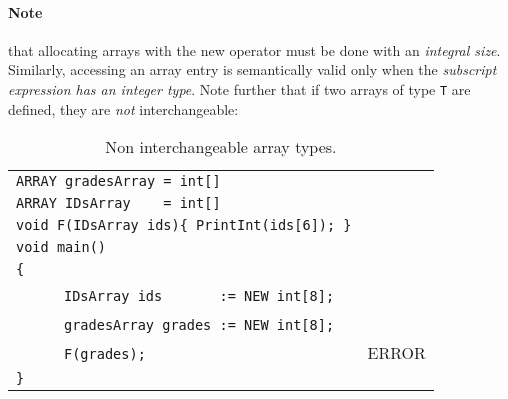 \documentclass{article}
\begin{document}
\paragraph{Note} that allocating arrays with the new operator
must be done with an \textit{integral size}.
Similarly, accessing an array entry is semantically valid
only when the \textit{subscript expression has an integer type}.
Note further that if two arrays of type \verb"T" are defined,
they are \textit{not} interchangeable:
\begin{table}[h]
\centering
\begin{tabular}{ | l | l | }
\hline
\verb"ARRAY gradesArray = int[]"                 &       \\
\verb"ARRAY IDsArray    = int[]"                 &       \\
\verb"void F(IDsArray ids){ PrintInt(ids[6]); }" &       \\
\verb"void main()"                               &       \\
\verb"{"                                         &       \\
~ ~ ~ ~\verb"IDsArray ids       := NEW int[8];"  &       \\
~ ~ ~ ~\verb"gradesArray grades := NEW int[8];"  &       \\
~ ~ ~ ~\verb"F(grades);"                         & ERROR \\
\verb"}"                                         &       \\
\hline
\end{tabular}
\caption{Non interchangeable array types.
\label{Table_Code_Examples_nil_Instead_Of_Any_Array}}
\end{table}  
\end{document}
